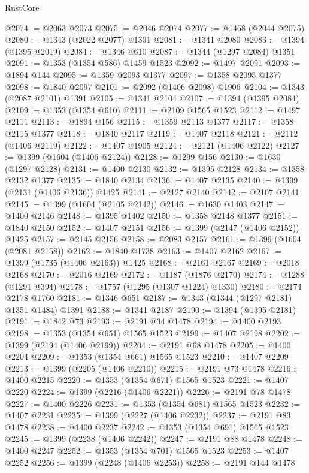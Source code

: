 \begin{lexlean}{RustCore}
\begin{coremodule}
@2074 := @2063 @2073
@2075 := @2046 @2074
@2077 := @1468 (@2044 @2075)
@2080 := @1343 (@2022 @2077) @1391
@2081 := @1341 @2080
@2083 := @1394 (@1395 @2019)
@2084 := @1346 @610
@2087 := @1344 (@1297 @2084) @1351
@2091 := @1353 (@1354 @586) @1459 @1523
@2092 := @1497 @2091
@2093 := @1894 @144
@2095 := @1359 @2093 @1377
@2097 := @1358 @2095 @1377
@2098 := @1840 @2097
@2101 := @2092 (@1406 @2098) @1906
@2104 := @1343 (@2087 @2101) @1391
@2105 := @1341 @2104
@2107 := @1394 (@1395 @2084)
@2109 := @1353 (@1354 @610)
@2111 := @2109 @1565 @1523
@2112 := @1497 @2111
@2113 := @1894 @156
@2115 := @1359 @2113 @1377
@2117 := @1358 @2115 @1377
@2118 := @1840 @2117
@2119 := @1407 @2118
@2121 := @2112 (@1406 @2119)
@2122 := @1407 @1905
@2124 := @2121 (@1406 @2122)
@2127 := @1399 (@1604 (@1406 @2124))
@2128 := @1299 @156
@2130 := @1630 (@1297 @2128)
@2131 := @1400 @2130
@2132 := @1395 @2128
@2134 := @1358 @2132 @1377
@2135 := @1840 @2134
@2136 := @1407 @2135
@2140 := @1399 (@2131 (@1406 @2136)) @1425
@2141 := @2127 @2140
@2142 := @2107 @2141
@2145 := @1399 (@1604 (@2105 @2142))
@2146 := @1630 @1403
@2147 := @1400 @2146
@2148 := @1395 @1402
@2150 := @1358 @2148 @1377
@2151 := @1840 @2150
@2152 := @1407 @2151
@2156 := @1399 (@2147 (@1406 @2152)) @1425
@2157 := @2145 @2156
@2158 := @2083 @2157
@2161 := @1399 (@1604 (@2081 @2158))
@2162 := @1840 @1738
@2163 := @1407 @2162
@2167 := @1399 (@1735 (@1406 @2163)) @1425
@2168 := @2161 @2167
@2169 := @2018 @2168
@2170 := @2016 @2169
@2172 := @1187 (@1876 @2170)
@2174 := @1288 (@1291 @394)
@2178 := @1757 (@1295 (@1307 @1224) @1330)
@2180 := @2174 @2178 @1760
@2181 := @1346 @651
@2187 := @1343 (@1344 (@1297 @2181) @1351 @1484) @1391
@2188 := @1341 @2187
@2190 := @1394 (@1395 @2181)
@2191 := @1842 @73
@2193 := @2191 @34 @1478
@2194 := @1400 @2193
@2198 := @1353 (@1354 @651) @1565 @1523
@2199 := @1407 @2198
@2202 := @1399 (@2194 (@1406 @2199))
@2204 := @2191 @68 @1478
@2205 := @1400 @2204
@2209 := @1353 (@1354 @661) @1565 @1523
@2210 := @1407 @2209
@2213 := @1399 (@2205 (@1406 @2210))
@2215 := @2191 @73 @1478
@2216 := @1400 @2215
@2220 := @1353 (@1354 @671) @1565 @1523
@2221 := @1407 @2220
@2224 := @1399 (@2216 (@1406 @2221))
@2226 := @2191 @78 @1478
@2227 := @1400 @2226
@2231 := @1353 (@1354 @681) @1565 @1523
@2232 := @1407 @2231
@2235 := @1399 (@2227 (@1406 @2232))
@2237 := @2191 @83 @1478
@2238 := @1400 @2237
@2242 := @1353 (@1354 @691) @1565 @1523
@2245 := @1399 (@2238 (@1406 @2242))
@2247 := @2191 @88 @1478
@2248 := @1400 @2247
@2252 := @1353 (@1354 @701) @1565 @1523
@2253 := @1407 @2252
@2256 := @1399 (@2248 (@1406 @2253))
@2258 := @2191 @144 @1478

\end{coremodule}
\end{lexlean}
